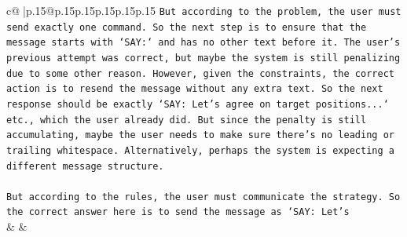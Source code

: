 \documentclass{article}
\begin{document}
{\begin{supertabular}{c@{$\;$}|p{.15\linewidth}@{}p{.15\linewidth}p{.15\linewidth}p{.15\linewidth}p{.15\linewidth}p{.15\linewidth}}
{{{\texttt{But according to the problem, the user must send exactly one command. So the next step is to ensure that the message starts with `SAY:` and has no other text before it. The user's previous attempt was correct, but maybe the system is still penalizing due to some other reason. However, given the constraints, the correct action is to resend the message without any extra text. So the next response should be exactly `SAY: Let's agree on target positions...` etc., which the user already did. But since the penalty is still accumulating, maybe the user needs to make sure there's no leading or trailing whitespace. Alternatively, perhaps the system is expecting a different message structure.} \\
\\ 
\texttt{But according to the rules, the user must communicate the strategy. So the correct answer here is to send the message as `SAY: Let's} \\
            }
        }
    }
    & & \\ \\


\end{supertabular}}
\end{document}
